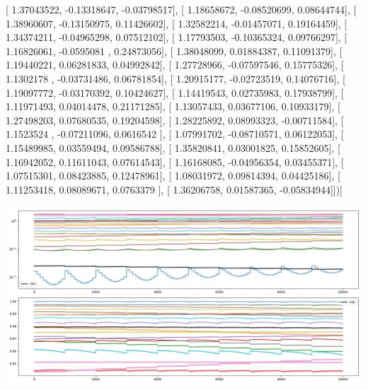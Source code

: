 \documentclass{article}
\begin{document}
       [ 1.37043522, -0.13318647, -0.03798517],
       [ 1.18658672, -0.08520699,  0.08644744],
       [ 1.38960607, -0.13150975,  0.11426602],
       [ 1.32582214, -0.01457071,  0.19164459],
       [ 1.34374211, -0.04965298,  0.07512102],
       [ 1.17793503, -0.10365324,  0.09766297],
       [ 1.16826061, -0.0595081 ,  0.24873056],
       [ 1.38048099,  0.01884387,  0.11091379],
       [ 1.19440221,  0.06281833,  0.04992842],
       [ 1.27728966, -0.07597546,  0.15775326],
       [ 1.1302178 , -0.03731486,  0.06781854],
       [ 1.20915177, -0.02723519,  0.14076716],
       [ 1.19097772, -0.03170392,  0.10424627],
       [ 1.14419543,  0.02735983,  0.17938799],
       [ 1.11971493,  0.04014478,  0.21171285],
       [ 1.13057433,  0.03677106,  0.10933179],
       [ 1.27498203,  0.07680535,  0.19204598],
       [ 1.28225892,  0.08993323, -0.00711584],
       [ 1.1523524 , -0.07211096,  0.0616542 ],
       [ 1.07991702, -0.08710571,  0.06122053],
       [ 1.15489985,  0.03559494,  0.09586788],
       [ 1.35820841,  0.03001825,  0.15852605],
       [ 1.16942052,  0.11611043,  0.07614543],
       [ 1.16168085, -0.04956354,  0.03455371],
       [ 1.07515301,  0.08423885,  0.12478961],
       [ 1.08031972,  0.09814394,  0.04425186],
       [ 1.11253418,  0.08089671,  0.0763379 ],
       [ 1.36206758,  0.01587365, -0.05834944]])]
\begin{center}
\includegraphics[scale=.9]{control_dpn_all.png}

\end{center}
\end{document}

